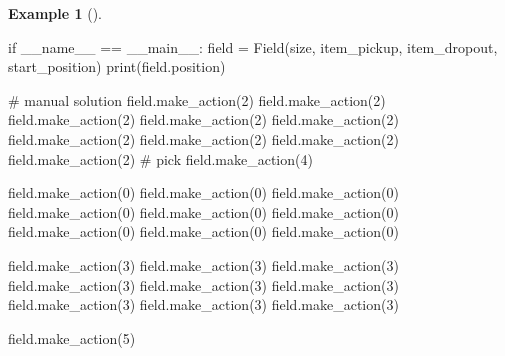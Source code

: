 \documentclass[
  letterpaper,
]{krantz}
\makeatletter
\newenvironment{Shaded}{\begin{snugshade}}{\end{snugshade}}
\newcommand{\BuiltInTok}[1]{\textcolor[rgb]{0.00,0.23,0.31}{#1}}
\newcommand{\CommentTok}[1]{\textcolor[rgb]{0.37,0.37,0.37}{#1}}
\newcommand{\ControlFlowTok}[1]{\textcolor[rgb]{0.00,0.23,0.31}{#1}}
\newcommand{\DecValTok}[1]{\textcolor[rgb]{0.68,0.00,0.00}{#1}}
\newcommand{\NormalTok}[1]{\textcolor[rgb]{0.00,0.23,0.31}{#1}}
\newcommand{\OperatorTok}[1]{\textcolor[rgb]{0.37,0.37,0.37}{#1}}
\newcommand{\StringTok}[1]{\textcolor[rgb]{0.13,0.47,0.30}{#1}}
\newcommand{\VariableTok}[1]{\textcolor[rgb]{0.07,0.07,0.07}{#1}}
\newenvironment{kframe}{%
\medskip{}
\setlength{\fboxsep}{.8em}
 \def\at@end@of@kframe{}%
 \ifinner\ifhmode%
  \def\at@end@of@kframe{\end{minipage}}%
  \begin{minipage}{\columnwidth}%
 \fi\fi%
 \def\FrameCommand##1{\hskip\@totalleftmargin \hskip-\fboxsep
 \colorbox{shadecolor}{##1}\hskip-\fboxsep
     \hskip-\linewidth \hskip-\@totalleftmargin \hskip\columnwidth}%
 \MakeFramed {\advance\hsize-\width
   \@totalleftmargin\z@ \linewidth\hsize
   \@setminipage}}%
 {\par\unskip\endMakeFramed%
 \at@end@of@kframe}
\renewenvironment{Shaded}{\begin{kframe}}{\end{kframe}}
\theoremstyle{plain}
\theoremstyle{definition}
\newtheorem{example}{Example}[chapter]
\theoremstyle{definition}
\theoremstyle{remark}
\makeatother
\begin{document}
\begin{example}[]
\begin{tcolorbox}[enhanced jigsaw, bottomrule=.15mm, opacityback=0, breakable, colframe=quarto-callout-tip-color-frame, left=2mm, rightrule=.15mm, toprule=.15mm, leftrule=.75mm, arc=.35mm, colback=white]
\begin{codelisting}[H]
\begin{Shaded}
\begin{Highlighting}[]
\ControlFlowTok{if} \VariableTok{\_\_name\_\_} \OperatorTok{==} \StringTok{\textquotesingle{}\_\_main\_\_\textquotesingle{}}\NormalTok{:}
\NormalTok{    field }\OperatorTok{=}\NormalTok{ Field(size, item\_pickup, item\_dropout, start\_position)}
    \BuiltInTok{print}\NormalTok{(field.position)}
    
\CommentTok{\# manual solution}
\NormalTok{field.make\_action(}\DecValTok{2}\NormalTok{)}
\NormalTok{field.make\_action(}\DecValTok{2}\NormalTok{)}
\NormalTok{field.make\_action(}\DecValTok{2}\NormalTok{)}
\NormalTok{field.make\_action(}\DecValTok{2}\NormalTok{)}
\NormalTok{field.make\_action(}\DecValTok{2}\NormalTok{)}
\NormalTok{field.make\_action(}\DecValTok{2}\NormalTok{)}
\NormalTok{field.make\_action(}\DecValTok{2}\NormalTok{)}
\NormalTok{field.make\_action(}\DecValTok{2}\NormalTok{)}
\NormalTok{field.make\_action(}\DecValTok{2}\NormalTok{)}
\CommentTok{\# pick}
\NormalTok{field.make\_action(}\DecValTok{4}\NormalTok{)}

\NormalTok{field.make\_action(}\DecValTok{0}\NormalTok{)}
\NormalTok{field.make\_action(}\DecValTok{0}\NormalTok{)}
\NormalTok{field.make\_action(}\DecValTok{0}\NormalTok{)}
\NormalTok{field.make\_action(}\DecValTok{0}\NormalTok{)}
\NormalTok{field.make\_action(}\DecValTok{0}\NormalTok{)}
\NormalTok{field.make\_action(}\DecValTok{0}\NormalTok{)}
\NormalTok{field.make\_action(}\DecValTok{0}\NormalTok{)}
\NormalTok{field.make\_action(}\DecValTok{0}\NormalTok{)}
\NormalTok{field.make\_action(}\DecValTok{0}\NormalTok{)}

\NormalTok{field.make\_action(}\DecValTok{3}\NormalTok{)}
\NormalTok{field.make\_action(}\DecValTok{3}\NormalTok{)}
\NormalTok{field.make\_action(}\DecValTok{3}\NormalTok{)}
\NormalTok{field.make\_action(}\DecValTok{3}\NormalTok{)}
\NormalTok{field.make\_action(}\DecValTok{3}\NormalTok{)}
\NormalTok{field.make\_action(}\DecValTok{3}\NormalTok{)}
\NormalTok{field.make\_action(}\DecValTok{3}\NormalTok{)}
\NormalTok{field.make\_action(}\DecValTok{3}\NormalTok{)}
\NormalTok{field.make\_action(}\DecValTok{3}\NormalTok{)}

\NormalTok{field.make\_action(}\DecValTok{5}\NormalTok{)}
\end{Highlighting}
\end{Shaded}

\end{codelisting}

\end{tcolorbox}

\begin{tcolorbox}[enhanced jigsaw, bottomrule=.15mm, opacityback=0, breakable, colframe=quarto-callout-tip-color-frame, left=2mm, rightrule=.15mm, toprule=.15mm, leftrule=.75mm, arc=.35mm, colback=white]


\end{tcolorbox}
\end{example}
\end{document}

